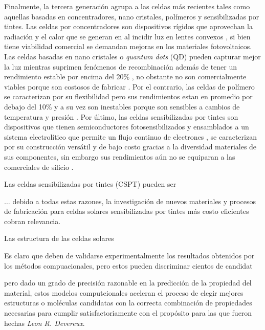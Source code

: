Finalmente, la tercera generación agrupa a las celdas más recientes tales como aquellas basadas en concentradores, nano cristales, polímeros y sensibilizadas por tintes. Las celdas por concentradores son dispositivos rígidos que aprovechan la radiación y el calor que se generan en al incidir luz en lentes convexos \cite{bertolli2008}, si bien tiene viabilidad comercial se demandan mejoras en los materiales fotovoltaicos. Las celdas basadas en nano cristales o \textit{quantum dots} (QD) pueden capturar mejor la luz mientras suprimen fenómenos de recombinación además de tener un rendimiento estable por encima del 20\% \cite{kim2022conformal}, no obstante no son comercialmente viables porque son costosos de fabricar \cite{jean2018synthesis}. Por el contrario, las celdas de polímero se caracterizan por su flexibilidad pero sus rendimientos estan en promedio por debajo del 10\% y a su vez son inestables porque son sensibles a cambios de temperatura y presión \cite{gusain2019polymer}. Por último, las celdas sensibilizadas por tintes son dispositivos que tienen semiconductores fotosensibilizados y ensamblados a un sistema electrolítico que permite un flujo continuo de electrones \cite{suhaimi2015materials}, se caracterizan por su construcción versátil y de bajo costo gracias a la diversidad materiales de sus componentes, sin embargo sus rendimientos aún no se equiparan a las comerciales de silicio \cite{sharma2018dye}. 


Las celdas sensibilizadas por tintes (CSPT) pueden ser 

$\dots$ debido a todas estas razones, la investigación de nuevos materiales y procesos de fabricación para celdas solares sensibilizadas por tintes más costo eficientes cobran relevancia. 


Las estructura de las celdas solares 


Es claro que deben de validarse experimentalmente los resultados obtenidos por los métodos compuacionales, pero estos pueden discriminar cientos de candidat


pero dado un grado de precisión razonable  en la predicción de la propiedad del material, estos modelos computcionales aceleran el proceso de elegir mejores estructuras o moléculas candidatas con la correcta combinación de propiedades necesarias para cumplir satisfactoriamente con el propósito para las que fueron hechas \textit{Leon R. Devereux}. 



